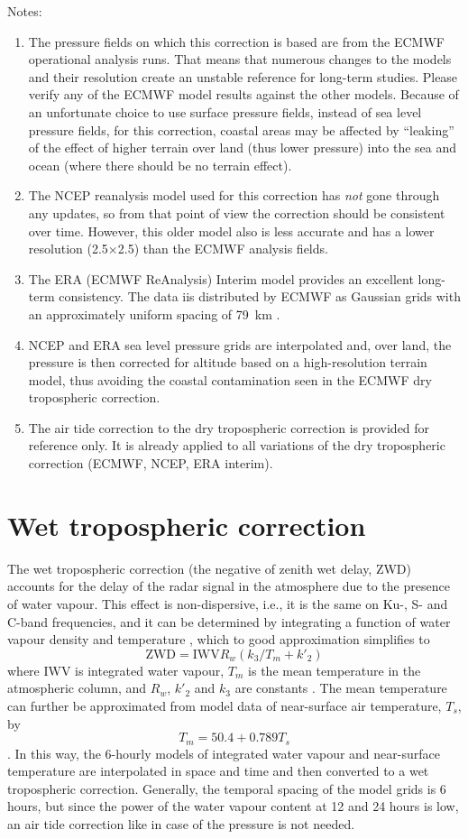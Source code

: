 \documentclass[a4paper,11pt,openany,natbib]{thesis}
\begin{document}
Notes:
\begin{enumerate}
\item The pressure fields on which this correction is based are from the ECMWF operational analysis runs. That means that numerous changes to the models and their resolution create an unstable reference for long-term studies. Please verify any of the ECMWF model results against the other models. Because of an unfortunate choice to use surface pressure fields, instead of sea level pressure fields, for this correction, coastal areas may be affected by ``leaking'' of the effect of higher terrain over land (thus lower pressure) into the sea and ocean (where there should be no terrain effect).
\item The NCEP reanalysis model used for this correction has \emph{not} gone through any updates, so from that point of view the correction should be consistent over time. However, this older model also is less accurate and has a lower resolution (2.5\deg$\times$2.5\deg) than the ECMWF analysis fields. 
\item The ERA (ECMWF ReAnalysis) Interim model provides an excellent long-term consistency. The data iis distributed by ECMWF as Gaussian grids with an approximately uniform spacing of 79~km \citep{berrisford2011}.
\item NCEP and ERA sea level pressure grids are interpolated and, over land, the pressure is then corrected for altitude based on a high-resolution terrain model, thus avoiding the coastal contamination seen in the ECMWF dry tropospheric correction.
\item The air tide correction to the dry tropospheric correction is provided for reference only. It is already applied to all variations of the dry tropospheric correction (ECMWF, NCEP, ERA interim).
\end{enumerate}

\section{Wet tropospheric correction}
The wet tropospheric correction (the negative of zenith wet delay, ZWD) accounts for the delay of the radar signal in the atmosphere due to the presence of water vapour. This effect is non-dispersive, i.e., it is the same on Ku-, S- and C-band frequencies, and it can be determined by integrating a function of water vapour density and temperature \citep[e.g.,][]{askne1987}, which to good approximation simplifies to
$$ \mathrm{ZWD} = \mathrm{IWV} R_w (k_3 / T_m + k'_2) $$
where IWV is integrated water vapour, $T_m$ is the mean temperature in the atmospheric column, and $R_w$, $k'_2$ and $k_3$ are constants \citep{bevis1994}. The mean temperature can further be approximated from model data of near-surface air temperature, $T_s$, by
$$ T_m = 50.4 + 0.789 T_s$$
\citep{mendes2000}. In this way, the 6-hourly models of integrated water vapour and near-surface temperature are interpolated in space and time and then converted to a wet tropospheric correction.
Generally, the temporal spacing of the model grids is 6 hours, but since the power of the water vapour content at 12 and 24 hours is low, an air tide correction like in case of the pressure is not needed.
\end{document}
